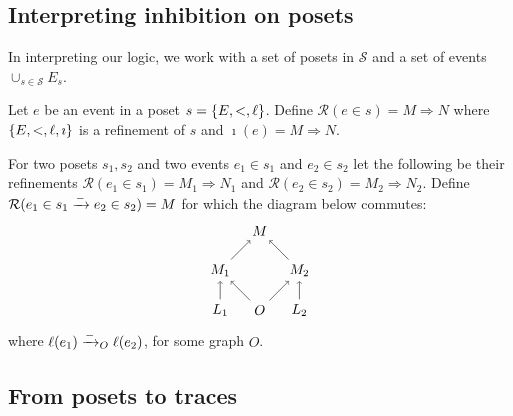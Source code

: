 \subsection{Interpreting inhibition on posets}

In interpreting our logic, we work with a set of posets in $\mathcal{S}$ and a set of events $\cup_{s\in\mathcal{S}} E_s$.

\begin{definition}
  Let $e$ be an event in a poset $s=\{E,<,\ell\}$.
  Define $\mathcal{R}(e\in s) = M\Rightarrow N$ where $\{E,<,\ell,\imath\}$ is a refinement of $s$ and $\imath(e) = M\Rightarrow N$.
\end{definition}

\begin{definition}
\label{def:ref_neg_infl}
  For two posets $s_1,s_2$ and two events $e_1\in s_1$ and $e_2\in s_2$ let the following be their refinements $\mathcal{R}(e_1\in s_1) = M_1\Rightarrow N_1$ and $\mathcal{R}(e_2\in s_2) = M_2\Rightarrow N_2$. Define $\mathcal{R}(e_1\in s_1\mathrel{\xrightarrow{-}} e_2\in s_2) = M$ for which the diagram below commutes:
  \[
  \begin{tikzpicture} %
    \node (o) at (0,0) {\(O\)};
    \node (n) at (0,2) {\(M\)};
    \node (l1) at (-1,0) {\(L_1\)};
    \node (l2) at (1,0) {\(L_2\)};
    \node (n1) at (-1,1) {\(M_1\)};
    \node (n2) at (1,1) {\(M_2\)};
    \draw [->] (l1) -- (n1);
    \draw [->] (l2) -- (n2);
    \draw [->] (o) -- (n1);
    \draw [->] (o) -- (n2);
    \draw [->] (n1) -- (n);
    \draw [->] (n2) -- (n);
  \end{tikzpicture}
  \]
  where $\ell(e_1)\mathrel{\xrightarrow{-}}_O\ell(e_2)$, for some graph $O$.
\end{definition}

\subsection{From posets to traces}

